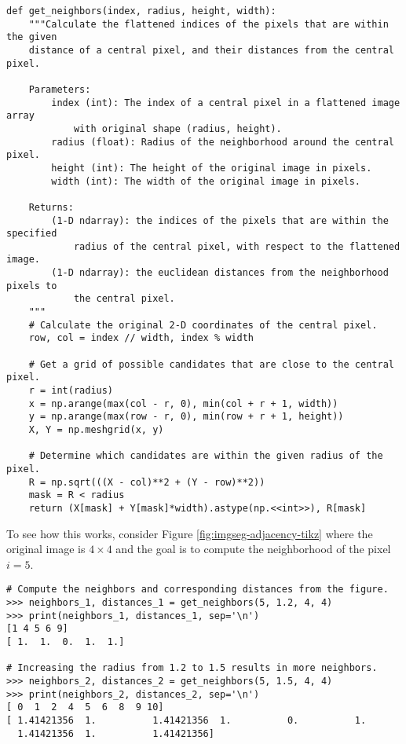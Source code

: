 \begin{lstlisting}
def get_neighbors(index, radius, height, width):
    """Calculate the flattened indices of the pixels that are within the given
    distance of a central pixel, and their distances from the central pixel.

    Parameters:
        index (int): The index of a central pixel in a flattened image array
            with original shape (radius, height).
        radius (float): Radius of the neighborhood around the central pixel.
        height (int): The height of the original image in pixels.
        width (int): The width of the original image in pixels.

    Returns:
        (1-D ndarray): the indices of the pixels that are within the specified
            radius of the central pixel, with respect to the flattened image.
        (1-D ndarray): the euclidean distances from the neighborhood pixels to
            the central pixel.
    """
    # Calculate the original 2-D coordinates of the central pixel.
    row, col = index // width, index % width

    # Get a grid of possible candidates that are close to the central pixel.
    r = int(radius)
    x = np.arange(max(col - r, 0), min(col + r + 1, width))
    y = np.arange(max(row - r, 0), min(row + r + 1, height))
    X, Y = np.meshgrid(x, y)

    # Determine which candidates are within the given radius of the pixel.
    R = np.sqrt(((X - col)**2 + (Y - row)**2))
    mask = R < radius
    return (X[mask] + Y[mask]*width).astype(np.<<int>>), R[mask]
\end{lstlisting}

To see how this works, consider Figure \ref{fig:imgseg-adjacency-tikz} where the original image is $4\times 4$ and the goal is to compute the neighborhood of the pixel $i = 5$.

\begin{lstlisting}
# Compute the neighbors and corresponding distances from the figure.
>>> neighbors_1, distances_1 = get_neighbors(5, 1.2, 4, 4)
>>> print(neighbors_1, distances_1, sep='\n')
[1 4 5 6 9]
[ 1.  1.  0.  1.  1.]

# Increasing the radius from 1.2 to 1.5 results in more neighbors.
>>> neighbors_2, distances_2 = get_neighbors(5, 1.5, 4, 4)
>>> print(neighbors_2, distances_2, sep='\n')
[ 0  1  2  4  5  6  8  9 10]
[ 1.41421356  1.          1.41421356  1.          0.          1.
  1.41421356  1.          1.41421356]
\end{lstlisting}

